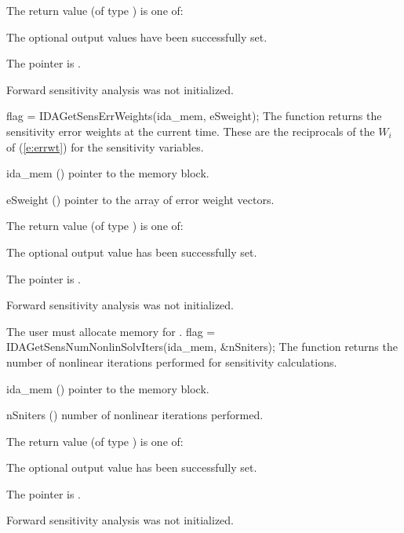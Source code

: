 {
  The return value  (of type ) is one of:
  \begin{args}
  \item[\Id{IDA\_SUCCESS}] 
    The optional output values have been successfully set.
  \item[\Id{IDA\_MEM\_NULL}]
    The  pointer is .
  \item[\Id{IDA\_NO\_SENS}]
    Forward sensitivity analysis was not initialized.
  \end{args}
}
{}
{
  flag = IDAGetSensErrWeights(ida\_mem, eSweight);
}
{
  The function  returns the sensitivity error weights at the
  current time. These are the reciprocals of the $W_i$ of (\ref{e:errwt}) for the
  sensitivity variables.
}
{
  \begin{args}
  \item[ida\_mem] ()
    pointer to the {\idas} memory block.
  \item[eSweight] ()
    pointer to the array of error weight vectors.
  \end{args}
}
{
  The return value  (of type ) is one of:
  \begin{args}
  \item[\Id{IDA\_SUCCESS}] 
    The optional output value has been successfully set.
  \item[\Id{IDA\_MEM\_NULL}]
    The  pointer is .
  \item[\Id{IDA\_NO\_SENS}]
    Forward sensitivity analysis was not initialized.
  \end{args}
}
{
  The user must allocate memory for .
}
{
  flag = IDAGetSensNumNonlinSolvIters(ida\_mem, \&nSniters);
}
{
  The function  returns the
  number of nonlinear iterations performed for 
  sensitivity calculations.
}
{
  \begin{args}
  \item[ida\_mem] ()
    pointer to the {\idas} memory block.
  \item[nSniters] ()
    number of nonlinear iterations performed.
  \end{args}
}
{
  The return value  (of type ) is one of:
  \begin{args}
  \item[\Id{IDA\_SUCCESS}] 
    The optional output value has been successfully set.
  \item[\Id{IDA\_MEM\_NULL}]
    The  pointer is .
  \item[\Id{IDA\_NO\_SENS}]
    Forward sensitivity analysis was not initialized.
  \end{args}
}
